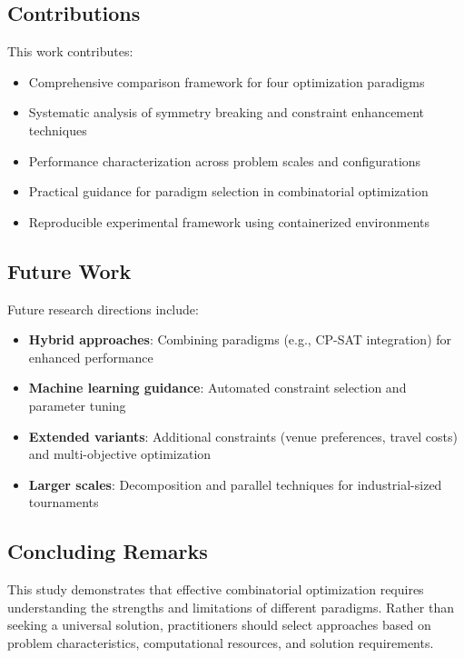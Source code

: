 \documentclass[11pt]{article}
\begin{document}
\subsection{Contributions}

This work contributes:
\begin{itemize}
    \item Comprehensive comparison framework for four optimization paradigms
    \item Systematic analysis of symmetry breaking and constraint enhancement techniques
    \item Performance characterization across problem scales and configurations
    \item Practical guidance for paradigm selection in combinatorial optimization
    \item Reproducible experimental framework using containerized environments
\end{itemize}

\subsection{Future Work}

Future research directions include:
\begin{itemize}
    \item \textbf{Hybrid approaches}: Combining paradigms (e.g., CP-SAT integration) for enhanced performance
    \item \textbf{Machine learning guidance}: Automated constraint selection and parameter tuning
    \item \textbf{Extended variants}: Additional constraints (venue preferences, travel costs) and multi-objective optimization
    \item \textbf{Larger scales}: Decomposition and parallel techniques for industrial-sized tournaments
\end{itemize}

\subsection{Concluding Remarks}

This study demonstrates that effective combinatorial optimization requires understanding the strengths and limitations of different paradigms. Rather than seeking a universal solution, practitioners should select approaches based on problem characteristics, computational resources, and solution requirements.
\end{document}
